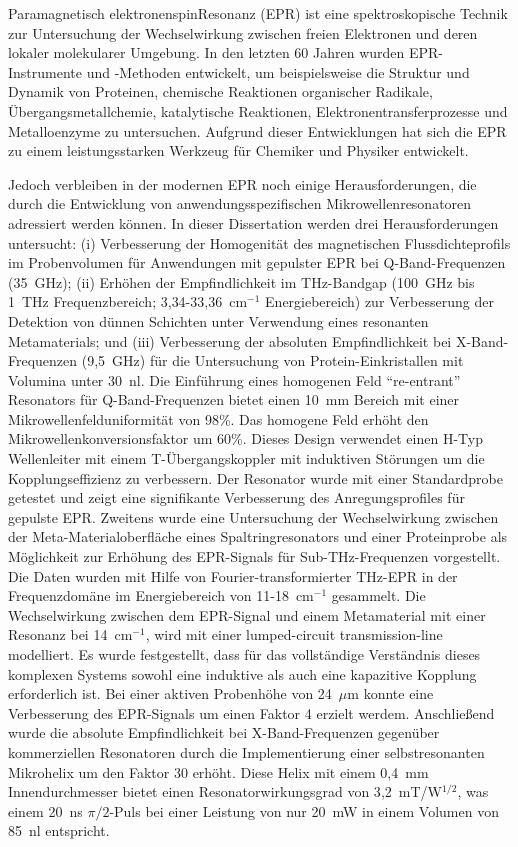 \vspace{-2em}
Paramagnetisch elektronenspinResonanz (EPR) ist eine spektroskopische Technik zur Untersuchung der Wechselwirkung zwischen freien Elektronen und deren lokaler molekularer Umgebung. In den letzten 60 Jahren wurden EPR-Instrumente und -Methoden entwickelt, um beispielsweise die Struktur und Dynamik von Proteinen, chemische Reaktionen organischer Radikale, Übergangsmetallchemie, katalytische Reaktionen, Elektronentransferprozesse und Metalloenzyme zu untersuchen. Aufgrund dieser Entwicklungen hat sich die EPR zu einem leistungsstarken Werkzeug für Chemiker und Physiker entwickelt.

Jedoch verbleiben in der modernen EPR noch einige Herausforderungen, die durch die Entwicklung von anwendungsspezifischen Mikrowellenresonatoren adressiert werden können. In dieser Dissertation werden drei Herausforderungen untersucht: (i) Verbesserung der Homogenität des magnetischen Flussdichteprofils im Probenvolumen für Anwendungen mit gepulster EPR bei Q-Band-Frequenzen (35~GHz); (ii) Erhöhen der Empfindlichkeit im THz-Bandgap (100~GHz bis 1~THz Frequenzbereich; 3{,}34-33{,}36~cm$^{-1}$ Energiebereich) zur Verbesserung der Detektion von dünnen Schichten unter Verwendung eines resonanten Metamaterials; und (iii) Verbesserung der absoluten Empfindlichkeit bei X-Band-Frequenzen (9{,}5~GHz) für die Untersuchung von Protein-Einkristallen mit Volumina unter 30~nl. Die Einführung eines homogenen Feld ``re-entrant'' \cylTE{} Resonators für Q-Band-Frequenzen bietet einen 10~mm Bereich mit einer Mikrowellenfelduniformität von 98\%. Das homogene Feld erhöht den Mikrowellenkonversionsfaktor um 60\%. Dieses Design verwendet einen H-Typ Wellenleiter mit einem T-Übergangskoppler mit induktiven St\"{o}rungen um die Kopplungseffizienz zu verbessern. Der Resonator wurde mit einer Standardprobe getestet und zeigt eine signifikante Verbesserung des Anregungsprofiles für gepulste EPR. Zweitens wurde eine Untersuchung der Wechselwirkung zwischen der Meta-Materialoberfläche eines Spaltringresonators und einer Proteinprobe als Möglichkeit zur Erhöhung des EPR-Signals für Sub-THz-Frequenzen vorgestellt. Die Daten wurden mit Hilfe von Fourier-transformierter THz-EPR in der Frequenzdomäne im Energiebereich von 11-18~cm$^{-1}$ gesammelt.  Die Wechselwirkung zwischen dem EPR-Signal und einem Metamaterial mit einer Resonanz bei 14~cm$^{-1}$, wird mit einer lumped-circuit transmission-line modelliert. Es wurde festgestellt, dass für das vollständige Verständnis dieses komplexen Systems sowohl eine induktive als auch eine kapazitive Kopplung erforderlich ist. Bei einer aktiven Probenhöhe von 24~$\mu$m konnte eine Verbesserung des EPR-Signals um einen Faktor 4 erzielt werdem. Anschließend wurde die absolute Empfindlichkeit bei X-Band-Frequenzen gegenüber kommerziellen Resonatoren durch die Implementierung einer selbstresonanten Mikrohelix um den Faktor 30 erhöht. Diese Helix mit einem 0{,}4~mm Innendurchmesser bietet einen Resonatorwirkungsgrad von 3{,}2~mT/W$^{1/2}$, was einem 20~ns $\pi/2$-Puls bei einer Leistung von nur 20~mW in einem Volumen von 85~nl entspricht. %
